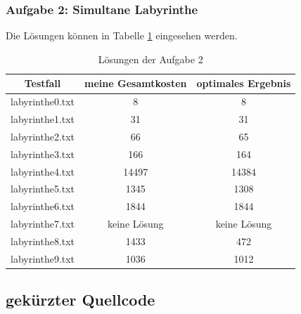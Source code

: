 \documentclass[a4paper,12pt,ngerman]{scrartcl}
\begin{document}
\subsubsection{Aufgabe 2: Simultane Labyrinthe}
\label{subsubsec:lösungen_aufgabe2}
Die Lösungen können in Tabelle \ref{tab:lo_aufgabe2} eingesehen werden.
\begin{table}[H]
  \centering
  \begin{tabular}{|c|c|c|}
  \hline
  \textbf{Testfall} & \textbf{meine Gesamtkosten} & \textbf{optimales Ergebnis} \\ \hline
  labyrinthe0.txt & 8 & 8 \\ \hline
  labyrinthe1.txt & 31 & 31 \\ \hline
  labyrinthe2.txt & 66 & 65 \\ \hline
  labyrinthe3.txt & 166 & 164 \\ \hline
  labyrinthe4.txt & 14497 & 14384 \\ \hline
  labyrinthe5.txt & 1345 & 1308 \\ \hline
  labyrinthe6.txt & 1844 & 1844 \\ \hline
  labyrinthe7.txt & keine Lösung & keine Lösung \\ \hline
  labyrinthe8.txt & 1433 & 472 \\ \hline
  labyrinthe9.txt & 1036 & 1012 \\ \hline
  \end{tabular}
  \caption{Lösungen der Aufgabe 2}
  \label{tab:lo_aufgabe2}
\end{table}
\subsection{gekürzter Quellcode}
\end{document}
